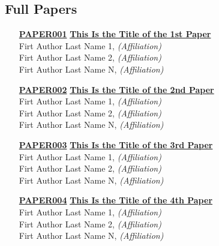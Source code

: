 
\subsection{Full Papers}
\begin{enumerate}
\item[\href{https://doi.org/10.1145/1122445.1122456}{\textbf{PAPER001}}]
\href{https://doi.org/10.1145/1122445.1122456}{\textbf{This Is the Title of the 1st Paper}}\\
Firt Author Last Name 1, \emph{(Affiliation)}\\
Firt Author Last Name 2, \emph{(Affiliation)}\\
Firt Author Last Name N, \emph{(Affiliation)}\\

\item[\href{https://doi.org/10.1145/1122445.1122456}{\textbf{PAPER002}}]
\href{https://doi.org/10.1145/1122445.1122456}{\textbf{This Is the Title of the 2nd Paper}}\\
Firt Author Last Name 1, \emph{(Affiliation)}\\
Firt Author Last Name 2, \emph{(Affiliation)}\\
Firt Author Last Name N, \emph{(Affiliation)}\\

\item[\href{https://doi.org/10.1145/1122445.1122456}{\textbf{PAPER003}}]
\href{https://doi.org/10.1145/1122445.1122456}{\textbf{This Is the Title of the 3rd Paper}}\\
Firt Author Last Name 1, \emph{(Affiliation)}\\
Firt Author Last Name 2, \emph{(Affiliation)}\\
Firt Author Last Name N, \emph{(Affiliation)}\\

\item[\href{https://doi.org/10.1145/1122445.1122456}{\textbf{PAPER004}}]
\href{https://doi.org/10.1145/1122445.1122456}{\textbf{This Is the Title of the 4th Paper}}\\
Firt Author Last Name 1, \emph{(Affiliation)}\\
Firt Author Last Name 2, \emph{(Affiliation)}\\
Firt Author Last Name N, \emph{(Affiliation)}\\
\end{enumerate}


